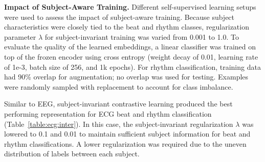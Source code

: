 \documentclass{article}
\renewcommand{\paragraph}[1]{\textbf{#1}\hspace{1em}}
\begin{document}
\paragraph{Impact of Subject-Aware Training.} Different self-supervised learning
setups were used to assess the impact of subject-aware training. Because subject
characteristics were closely tied to the beat and rhythm classes, regularization
parameter $\lambda$ for subject-invariant training was varied from 0.001 to 1.0.
To evaluate the quality of the learned embeddings, a linear classifier was
trained on top of the frozen encoder using cross entropy (weight decay of 0.01,
learning rate of 1e-3, batch size of 256, and 1k epochs). For rhythm
classification, training data had 90\% overlap for augmentation; no overlap was
used for testing. Examples were randomly sampled with replacement to account for
class imbalance.

Similar to EEG, subject-invariant contrastive learning produced the best
performing representation for ECG beat and rhythm classification
(Table~\ref{table:ecg:inter}). In this case, the subject-invariant
regularization $\lambda$ was lowered to 0.1 and 0.01 to maintain sufficient
subject information for beat and rhythm classifications. A lower regularization
was required due to the uneven distribution of labels between each subject.
\end{document}

